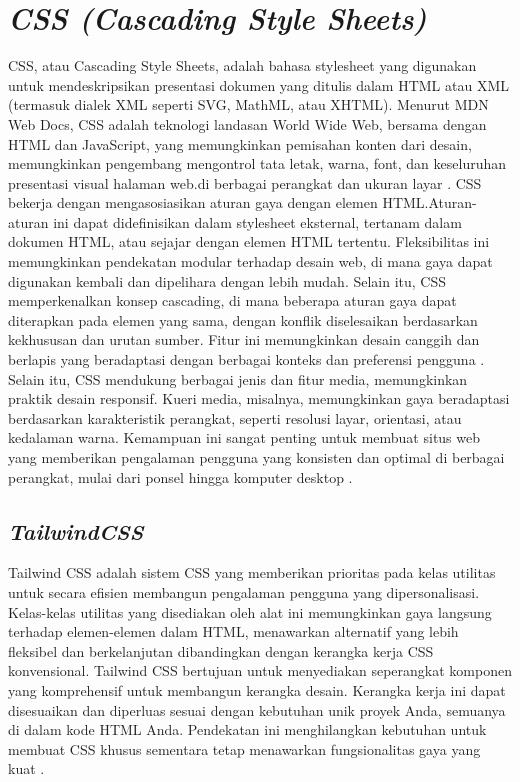 \section{\textit{CSS (Cascading Style Sheets)}}
CSS, atau Cascading Style Sheets, adalah bahasa stylesheet yang digunakan untuk mendeskripsikan presentasi dokumen yang ditulis dalam HTML atau XML (termasuk dialek XML seperti SVG, MathML, atau XHTML). Menurut MDN Web Docs, CSS adalah teknologi landasan World Wide Web, bersama dengan HTML dan JavaScript, yang memungkinkan pemisahan konten dari desain, memungkinkan pengembang mengontrol tata letak, warna, font, dan keseluruhan presentasi visual halaman web.\@ di berbagai perangkat dan ukuran layar \citep{mozilla2025mdn}.
\singlespacing{}
CSS bekerja dengan mengasosiasikan aturan gaya dengan elemen HTML.\@ Aturan-aturan ini dapat didefinisikan dalam stylesheet eksternal, tertanam dalam dokumen HTML, atau sejajar dengan elemen HTML tertentu. Fleksibilitas ini memungkinkan pendekatan modular terhadap desain web, di mana gaya dapat digunakan kembali dan dipelihara dengan lebih mudah. Selain itu, CSS memperkenalkan konsep cascading, di mana beberapa aturan gaya dapat diterapkan pada elemen yang sama, dengan konflik diselesaikan berdasarkan kekhususan dan urutan sumber. Fitur ini memungkinkan desain canggih dan berlapis yang beradaptasi dengan berbagai konteks dan preferensi pengguna \citep{mozilla2025mdn}.
\singlespacing{}
Selain itu, CSS mendukung berbagai jenis dan fitur media, memungkinkan praktik desain responsif. Kueri media, misalnya, memungkinkan gaya beradaptasi berdasarkan karakteristik perangkat, seperti resolusi layar, orientasi, atau kedalaman warna. Kemampuan ini sangat penting untuk membuat situs web yang memberikan pengalaman pengguna yang konsisten dan optimal di berbagai perangkat, mulai dari ponsel hingga komputer desktop \citep{mozilla2025mdn}.

\subsection{\textit{TailwindCSS}}
Tailwind CSS adalah sistem CSS yang memberikan prioritas pada kelas utilitas untuk secara efisien membangun pengalaman pengguna yang dipersonalisasi. Kelas-kelas utilitas yang disediakan oleh alat ini memungkinkan gaya langsung terhadap elemen-elemen dalam HTML, menawarkan alternatif yang lebih fleksibel dan berkelanjutan dibandingkan dengan kerangka kerja CSS konvensional. Tailwind CSS bertujuan untuk menyediakan seperangkat komponen yang komprehensif untuk membangun kerangka desain. Kerangka kerja ini dapat disesuaikan dan diperluas sesuai dengan kebutuhan unik proyek Anda, semuanya di dalam kode HTML Anda. Pendekatan ini menghilangkan kebutuhan untuk membuat CSS khusus sementara tetap menawarkan fungsionalitas gaya yang kuat \citep{tailwind}.

